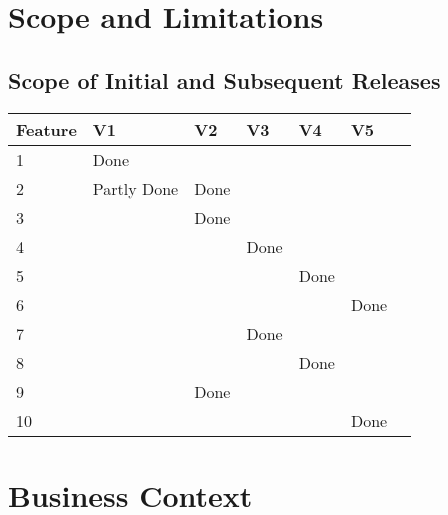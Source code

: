 \documentclass[letter]{scrartcl}
\begin{document}
\section{Scope and Limitations}
\subsection{Scope of Initial and Subsequent Releases}
\begin{tabularx}{\textwidth}{| X | X | X | X | X | X | X |}
\hline
\textbf{Feature} & \textbf{V1} & \textbf{V2} & \textbf{V3} & \textbf{V4} & \textbf{V5} \\
\hline
\hline
1 & Done & & & & \\
\hline
2 & Partly Done & Done & & & \\
\hline
3 & & Done & & & \\
\hline
4 & & & Done & & \\
\hline
5 & & & & Done & \\
\hline
6 & & & & & Done \\
\hline
7 & & & Done & & \\
\hline
8 & & & & Done & \\
\hline
9 & & Done & & & \\
\hline
10 & & & & & Done \\
\hline
\end{tabularx}



\section{Business Context}
\end{document}
